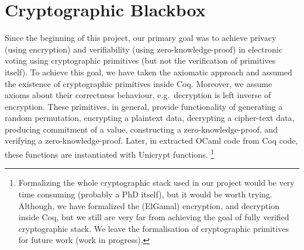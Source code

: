 \section{Cryptographic Blackbox}
Since the beginning of this project, our primary goal was 
to achieve privacy (using encryption) and verifiability (using zero-knowledge-proof) in electronic voting 
using cryptographic primitives (but not the verification of primitives itself). 
To achieve this goal, we have 
taken the axiomatic approach and assumed the existence of cryptographic primitives 
inside Coq. Moreover, we assume axioms about their correctness behaviour, e.g.~decryption 
is left inverse of encryption. These primitives, in general, provide functionality 
of generating a random permutation, encrypting a plaintext data, decrypting a cipher-text data, 
producing commitment of a value, constructing a zero-knowledge-proof, 
and verifying a zero-knowledge-proof. Later, in extracted OCaml code from Coq code, these functions are instantiated 
with Unicrypt \citep{LocherH14} functions. 
\footnote{Formalizing the whole cryptographic stack used in our 
project would be very time consuming (probably a PhD itself), but it would be worth trying. 
Although, we have formalized the (ElGamal) encryption, and decryption inside Coq, but we still 
are very far from achieving the goal of fully verified cryptographic stack.  We leave the formalisation 
of cryptographic primitives for future work (work in progress).}



